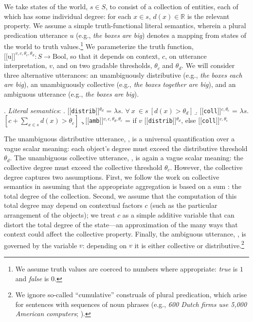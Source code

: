 \documentclass[preprint,12pt,authoryear,titlepage]{elsarticle}
\newcommand{\sem}[1]{\mbox{$[\![$#1$]\!]$}}
\newcommand{\lam}{$\lambda$}
\begin{document}
We take states of the world, $s\in S$, to consist of a collection of entities, each of which has some individual degree: for each $x\in s$, $d(x)\in \mathbb R$ is the relevant property.
We assume a simple truth-functional literal semantics, wherein a plural predication utterance $u$ (e.g., \emph{the boxes are big})  denotes a mapping from states of the world to truth values.\footnote{We assume truth values are coerced to numbers where appropriate: \emph{true} is $1$ and \emph{false} is $0$.} We parameterize the truth function, $\sem{u}^{v,c,\theta_c,\theta_d}: S \rightarrow \text{Bool}$, so that it depends on context, $c$, on utterance interpretation, $v$, and on two gradable thresholds, $\theta_c$ and $\theta_d$. 
We will consider three alternative utterances: 
an {unambiguously distributive} (e.g., \emph{the boxes each are big}), an {unambiguously collective} (e.g., \emph{the boxes together are big}), and an {ambiguous} utterance (e.g., \emph{the boxes are big}).

\ex. \emph{Literal semantics}:
\a. \label{dist}\sem{\texttt{distrib}}$^{\theta_d}$ = 
\lam $s$. $\forall \ x\ \in s\ [d(x) > \theta_d]$
\b. \label{coll}\sem{\texttt{coll}}$^{c,\theta_c}$ = 
\lam $s$. $[c + \sum_{x\in s} d(x) > \theta_c]$
\c.  \label{amb}\sem{\texttt{amb}}$^{v, c, \theta_d, \theta_c}$ = 
if $v$ \sem{\texttt{distrib}}$^{\theta_d}$, else \sem{\texttt{coll}}$^{c,\theta_c}$

The unambiguous distributive utterance, \Last[a], is a universal quantification over a vague scalar meaning: each object's degree must exceed the distributive threshold $\theta_d$. 
The unambiguous collective utterance, \Last[b], is again a vague scalar meaning: the collective degree must exceed the collective threshold $\theta_c$. 
However, the collective degree captures two assumptions. First, we follow the work on collective semantics in assuming that the appropriate aggregation is based on a sum \citep[e.g.,][]{scha1984}: the total degree of the collection.
Second, we assume that the computation of this total degree may depend on contextual factors $c$ (such as the particular arrangement of the objects); we treat $c$ as a simple additive variable that can distort the total degree of the state---an approximation of the many ways that context could affect the collective property. 
Finally, the ambiguous utterance, \Last[c], is governed by the variable $v$: depending on $v$ it is either collective or distributive.\footnote{We ignore so-called ``cumulative'' construals of plural predication, which arise for sentences with sequences of noun phrases (e.g., \emph{600 Dutch firms use 5,000 American computers}; \citealp{scha1984}).}
\end{document}
